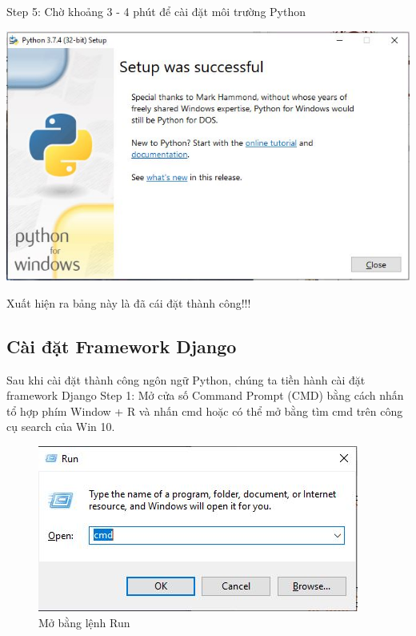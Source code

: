 \documentclass{article}
\begin{document}
Step 5: Chờ khoảng 3 - 4 phút để cài đặt môi trường Python

\includegraphics[scale =1]{8.jpg}

Xuất hiện ra bảng này là đã cái đặt thành công!!!

\fontsize{14}{20}\selectfont\subsection{Cài đặt Framework Django}

\fontsize{13}{20}\selectfont

Sau khi cài đặt thành công ngôn ngữ Python, chúng ta tiền hành cài đặt framework Django
Step 1: Mở cửa số Command Prompt (CMD) bằng cách nhấn tổ hợp phím Window + R và nhấn cmd hoặc có thể mở bằng tìm cmd trên công cụ search của Win 10.

    \begin{figure}[htp]
        \centering
        \includegraphics{9.jpg}
        \caption{Mở bằng lệnh Run}
    \end{figure}
    
\end{document}
